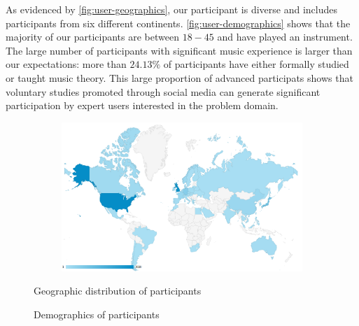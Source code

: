 As evidenced by \vref{fig:user-geographics}, our participant is diverse and
includes participants from six different continents.
\vref{fig:user-demographics} shows that the majority of our participants are
between $18-45$ and have played an instrument. The large number of participants
with significant music experience is larger than our expectations: more than
$24.13\%$ of participants have either formally studied or taught music theory.
This large proportion of advanced participats shows that voluntary studies
promoted through social media can generate significant participation by expert
users interested in the problem domain.

\begin{figure}[p]
  \centering
  \begin{subfigure}[b]{0.98\textwidth}
    \centering
    \includegraphics[width=1.0\linewidth]{participants-by-country.png}
  \end{subfigure}
  \begin{subfigure}[c]{0.55\textwidth}
    \centering
    
  \end{subfigure}
  \begin{subfigure}[c]{0.44\textwidth}
    \centering
    
  \end{subfigure}
  \caption{Geographic distribution of participants}
  \label{fig:user-geographics}
\end{figure}

\begin{figure}[tb]
  \centering
  
  \caption{Demographics of participants}
  \label{fig:user-demographics}
\end{figure}

